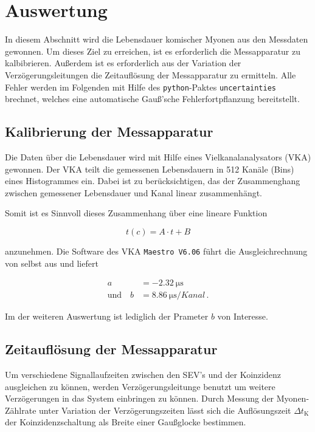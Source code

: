 \section{Auswertung}
\label{sec:evaluation}
In diesem Abschnitt wird die Lebensdauer komischer Myonen aus den Messdaten gewonnen.
Um dieses Ziel zu erreichen, ist es erforderlich die Messapparatur zu kalbibrieren. Außerdem
ist es erforderlich aus der Variation der Verzögerungsleitungen die
Zeitauflösung der Messapparatur zu ermitteln. Alle Fehler werden im Folgenden mit Hilfe
des \texttt{python}-Paktes \texttt{uncertainties} brechnet, welches eine automatische
Gauß'sche Fehlerfortpflanzung bereitstellt.

\subsection{Kalibrierung der Messapparatur}
\label{subsec:calibration}
Die Daten über die Lebensdauer wird mit Hilfe eines Vielkanalanalysators (VKA) gewonnen.
Der VKA teilt die gemessenen Lebensdauern in \num{512} Kanäle (Bins) eines Histogrammes ein.
Dabei ist zu berücksichtigen, das der Zusammenghang zwischen gemessener Lebensdauer und
Kanal linear zusammenhängt.

Somit ist es Sinnvoll dieses Zusammenhang über eine lineare Funktion

\begin{equation}
t(c) = A \cdot t + B
\end{equation}

anzunehmen. Die Software des VKA \texttt{Maestro V6.06} führt die Ausgleichrechnung von selbst aus
und liefert

\begin{align*}
	a &= \SI{-2.32}{\micro \second} \\
	\text{und} \quad b &= \SI[per-mode=fraction]{8.86}{\micro \second \per {Kanal}} \,.
\end{align*}

Im der weiteren Auswertung ist lediglich der Prameter $b$ von Interesse.

\subsection{Zeitauflösung der Messapparatur}
\label{subsec:timeresolution}
Um verschiedene Signallaufzeiten zwischen den SEV's und der Koinzidenz ausgleichen zu können, werden Verzögerungsleitunge
benutzt um weitere Verzögerungen in das System einbringen zu können. Durch Messung der Myonen-Zählrate unter Variation der Verzögerungszeiten lässt
sich die Auflösungszeit $\Delta t_\text{K}$ der Koinzidenzschaltung als Breite einer Gaußglocke bestimmen.


